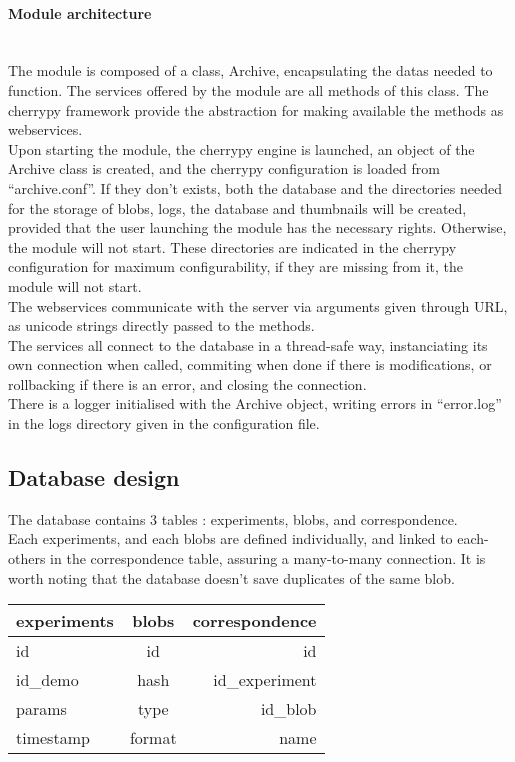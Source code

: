 \paragraph{Module architecture} \hspace{0pt} \\
The module is composed of a class, Archive, encapsulating the datas needed to function. The services offered by the module are all methods of this class. The cherrypy framework provide the abstraction for making available the methods as webservices. \\
Upon starting the module, the cherrypy engine is launched, an object of the Archive class is created, and the cherrypy configuration is loaded from ``archive.conf''. If they don't exists, both the database and the directories needed for the storage of blobs, logs, the database and thumbnails will be created, provided that the user launching the module has the necessary rights. Otherwise, the module will not start. These directories are indicated in the cherrypy configuration for maximum configurability, if they are missing from it, the module will not start. \\
The webservices communicate with the server via arguments given through URL, as unicode strings directly passed to the methods. \\
The services all connect to the database in a thread-safe way, instanciating its own connection when called, commiting when done if there is modifications, or rollbacking if there is an error, and closing the connection. \\
There is a logger initialised with the Archive object, writing errors in ``error.log'' in the logs directory given in the configuration file.

\subsection{Database design}

The database contains 3 tables : experiments, blobs, and correspondence.\\
Each experiments, and each blobs are defined individually, and linked to each-others in the correspondence table, assuring a many-to-many connection. It is worth noting that the database doesn't save duplicates of the same blob. \\

\begin{tabular}{|l|c|r|}
  \hline
  experiments & blobs & correspondence \\
  \hline
  id & id & id \\
  id\_demo & hash & id\_experiment \\
  params & type & id\_blob \\
  timestamp & format & name \\
  \hline
\end{tabular} \\

